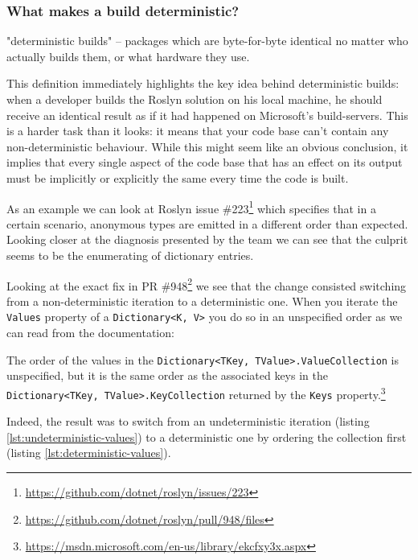 \subsubsection{What makes a build deterministic?}
\label{sec:deterministic-builds-what}

\begin{displayquote}
"deterministic builds" -- packages which are byte-for-byte identical no matter who actually builds them, or what hardware they use.\parencite{Perry2013} 
\end{displayquote}

\noindent This definition immediately highlights the key idea behind deterministic builds: when a developer builds the Roslyn solution on his local machine, he should receive an identical result as if it had happened on Microsoft's build-servers. This is a harder task than it looks: it means that your code base can't contain any non-deterministic behaviour. While this might seem like an obvious conclusion, it implies that every single aspect of the code base that has an effect on its output must be implicitly or explicitly the same every time the code is built. 

As an example we can look at Roslyn issue \#223\footnote{\url{https://github.com/dotnet/roslyn/issues/223}} which specifies that in a certain scenario, anonymous types are emitted in a different order than expected. Looking closer at the diagnosis presented by the team we can see that the culprit seems to be the enumerating of dictionary entries.

Looking at the exact fix in PR \#948\footnote{\url{https://github.com/dotnet/roslyn/pull/948/files}} we see that the change consisted switching from a non-deterministic iteration to a deterministic one. When you iterate the \texttt{Values} property of a \texttt{Dictionary<K, V>} you do so in an unspecified order as we can read from the documentation:

\begin{displayquote}
The order of the values in the \texttt{Dictionary<TKey, TValue>.ValueCollection} is unspecified, but it is the same order as the associated keys in the \texttt{Dictionary<TKey, TValue>.KeyCollection} returned by the \texttt{Keys} property.\footnote{\url{https://msdn.microsoft.com/en-us/library/ekcfxy3x.aspx}}
\end{displayquote}

\noindent Indeed, the result was to switch from an undeterministic iteration (listing \ref{lst:undeterministic-values}) to a deterministic one by ordering the collection first (listing \ref{lst:deterministic-values}).

